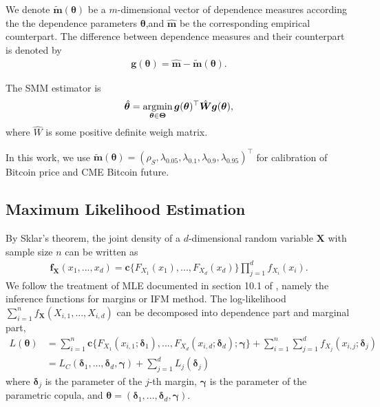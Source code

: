 We denote $\tilde{\bm{m}}(\bm{\theta})$ be a $m$-dimensional vector of dependence measures according the the
dependence parameters $\bm{\theta}$,and  $\hat{\bm{m}}$ be the corresponding empirical counterpart.
The difference between dependence measures and their counterpart is denoted by
\begin{align*}
    \bm{g}(\bm{\theta}) = \hat{\bm{m}} - \tilde{\bm{m}}(\bm{\theta}).
\end{align*}\medskip

The SMM estimator is
\begin{align*}
    \hat{\bm{\theta}} = \argmin_{\bm{\theta}\in \bm{\Theta}} \bm{g}(\bm{\theta})^\top
    \hat{\bm{W}}
     \bm{g}(\bm{\theta}),
\end{align*}
where $\hat{W}$ is some positive definite weigh matrix.\medskip

In this work, we use $\tilde{\bm{m}}(\bm{\theta}) = (\rho_S, \lambda_{0.05}, \lambda_{0.1},
\lambda_{0.9}, \lambda_{0.95})^\top$
for calibration of Bitcoin price and CME Bitcoin future.

\subsection{Maximum Likelihood Estimation}\label{subsec:maximum-likelihood-estimation}
By Sklar's theorem, the joint density of a $d$-dimensional random variable $\bm{X}$ with sample size $n$ can be written as
\begin{align}
    \bm{f}_{\bm{X}}(x_1, ..., x_d) = \bm{c}\{F_{X_1}(x_1), ..., F_{X_d}(x_d)\} \prod_{j=1}^d f_{X_i}(x_i).
    \end{align}
We follow the treatment of MLE documented in section 10.1 of \citet{joe1997multivariate}, namely the inference functions for margins or IFM method.
The log-likelihood $\sum^n_{i=1}f_{\bm{X}}(X_{i,1}, ..., X_{i,d})$ can be decomposed into dependence part and marginal part,
\begin{align}
    L(\bm{\theta}) &= \sum_{i=1}^n \bm{c}\{F_{X_1}(x_{i,1};\bm{\delta}_1), ..., F_{X_d}(x_{i,d}; \bm{\delta}_d);\bm{\gamma}\}
    + \sum_{i=1}^n \sum_{j=1}^d f_{X_j}(x_{i,j};\bm{\delta}_j)\\
    &= L_C(\bm{\delta}_1, ..., \bm{\delta}_d, \bm{\gamma}) + \sum_{j=1}^d L_j(\bm{\delta}_j)
    \end{align}
where $\bm{\delta}_j$ is the parameter of the $j$-th margin, $\bm{\gamma}$ is the parameter of the parametric copula, and
$\bm{\theta} = (\bm{\delta}_1,..., \bm{\delta}_d, \bm{\gamma})$.

